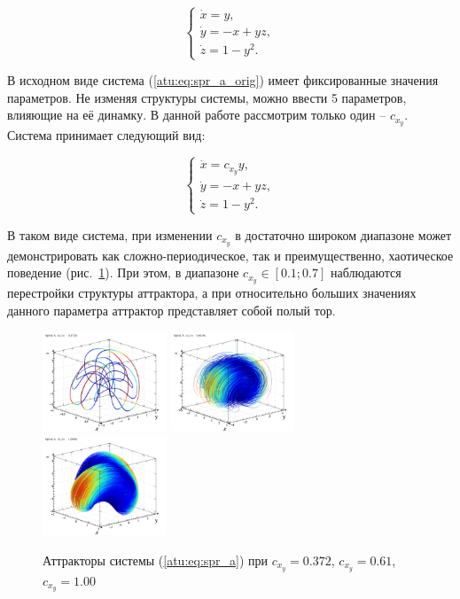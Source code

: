 \documentclass[a4paper,12pt]{article}
\begin{document}
\begin{equation}
  \begin{cases}
    \dot{x} =  y, \\
    \dot{y} = -x + yz, \\
    \dot{z} =  1 - y^2.
  \end{cases}
  \label{atu:eq:spr_a_orig}
\end{equation}


В исходном виде система (\ref{atu:eq:spr_a_orig}) имеет фиксированные значения параметров.
Не изменяя структуры системы, можно ввести 5 параметров, влияющие на её динамку. В
данной работе рассмотрим только один -- $c_{x_y} $. Система принимает следующий вид:

\begin{equation}
  \begin{cases}
    \dot{x} =  c_{x_y} y, \\
    \dot{y} = -x + yz, \\
    \dot{z} =  1 - y^2.
  \end{cases}
  \label{atu:eq:spr_a}
\end{equation}

В таком виде система, при изменении $c_{x_y} $
в достаточно широком диапазоне может демонстрировать как
сложно-периодическое, так и преимущественно, хаотическое
поведение (рис.~\ref{atu:f:spr_a_phase}). При этом, в диапазоне $c_{x_y} \in [0.1 ; 0.7] $
наблюдаются перестройки структуры аттрактора, а при относительно больших
значениях данного параметра аттрактор представляет собой полый тор.


\begin{figure}[htb!]
\centerline{
  \includegraphics[width=0.33\textwidth]{p/cha/spr_a/sprott_a-p_xyz_cx_y=0x372.png}
  \includegraphics[width=0.33\textwidth]{p/cha/spr_a/sprott_a-p_xyz_cx_y=0x610.png}
  \includegraphics[width=0.33\textwidth]{p/cha/spr_a/sprott_a-p_xyz_cx_y=1x000.png}
}
\caption{Аттракторы системы (\ref{atu:eq:spr_a})
  при $ c_{x_y} =0.372 $, $ c_{x_y} =0.61 $, $ c_{x_y} =1.00 $
}
\label{atu:f:spr_a_phase}
\end{figure}
\end{document}
